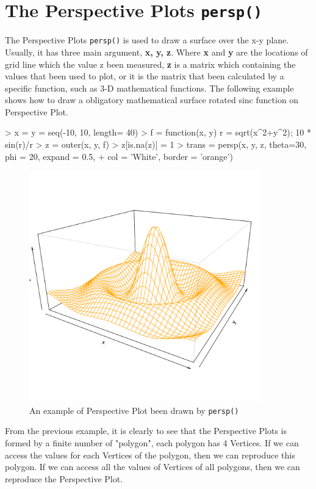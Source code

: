 \documentclass[paper=a4, fontsize=11pt]{report}
\begin{document}
\section{The Perspective Plots \texttt{persp()}}
The Perspective Plots \texttt{persp()} is used to draw a surface over the x-y plane. Usually, it has three main argument, \textbf{x, y, z}. Where \textbf{x} and \textbf{y} are the locations of grid line which the value z been measured, \textbf{z} is a matrix which containing the values that been used to plot, or it is the matrix that been calculated by a specific function, such as 3-D mathematical functions. The following example shows how to draw a obligatory mathematical surface rotated sinc function on Perspective Plot.
\begin{Schunk}
\begin{Sinput}
> x = y = seq(-10, 10, length= 40)
> f = function(x, y) { r = sqrt(x^2+y^2); 10 * sin(r)/r }
> z = outer(x, y, f)
> z[is.na(z)] = 1
> trans = persp(x, y, z, theta=30, phi = 20, expand = 0.5,
+               col = 'White', border = 'orange')
\end{Sinput}
\end{Schunk}
\begin{figure}[h]
\begin{center}
  \includegraphics[height = 10cm, width = 10cm]{figure/standalone_1.pdf}
  \caption{An example of Perspective Plot been drawn by \texttt{persp()}}
  	\label{figure4}
\end{center}
\end{figure}

From the previous example, it is clearly to see that the Perspective Plots is formed by a finite number of "polygon", each polygon has 4 Vertices. If we can access the values for each Vertices of the polygon, then we can reproduce this polygon. If we can access all the values of Vertices of all polygons, then we can reproduce the Perspective Plot. \\
\end{document}
